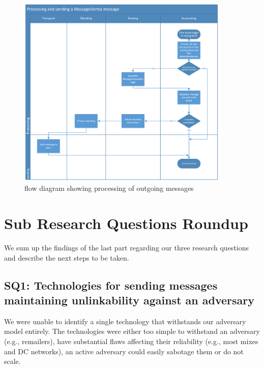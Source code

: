 \begin{figure}[hbt]
	\includegraphics[width=0.90\textwidth]{inc/flowchart_message_sending}
	\caption{flow diagram showing processing of outgoing messages}
	\label{fig:msgSendProcessing}
\end{figure}

\section{Sub Research Questions Roundup}
We sum up the findings of the last part regarding our three research questions and describe the next steps to be taken.

\subsection{SQ1: Technologies for sending messages maintaining unlinkability against an adversary}
We were unable to identify a single technology that withstands our adversary model entirely. The technologies were either too simple to withstand an adversary (e.g., remailers), have substantial flaws affecting their reliability (e.g., most mixes and DC networks), an active adversary could easily sabotage them or do not scale.

